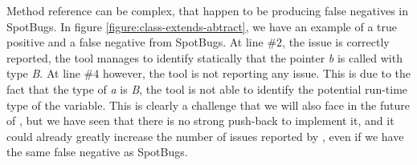 Method reference can be complex, that happen to be producing false negatives in SpotBugs. 
In figure \ref{figure:class-extends-abtract}, we have an example of a true positive and a false negative from SpotBugs. 
At line $\#2$, the issue is correctly reported, the tool manages to identify statically that the pointer \emph{b} is called with type \emph{B}. 
At line $\#4$ however, the tool is not reporting any issue. 
This is due to the fact that the type of \emph{a} is \emph{B}, the tool is not able to identify the potential run-time type of the variable. \newline
This is clearly a challenge that we will also face in the future of \slang{}, but we have seen that there is no strong push-back to implement it, and it could already greatly increase the number of issues reported by \slang{}, even if we have the same false negative as SpotBugs.